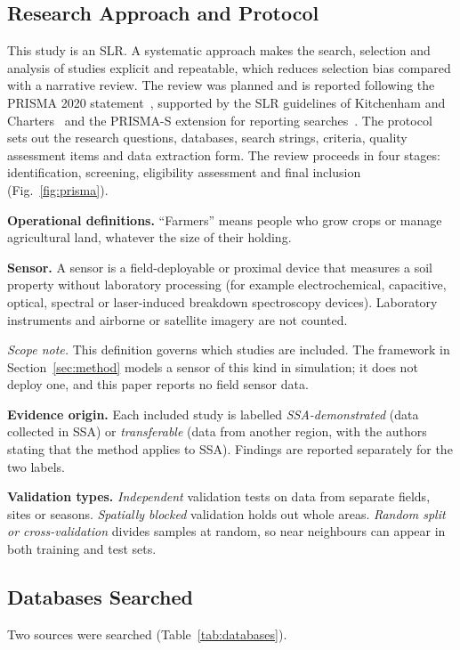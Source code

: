 \documentclass[conference]{IEEEtran}
\begin{document}
\subsection{Research Approach and Protocol}
This study is an SLR. A systematic approach makes the search, selection and
analysis of studies explicit and repeatable, which reduces selection bias
compared with a narrative review. The review was planned and is reported
following the PRISMA 2020 statement~\cite{ref12}, supported by the SLR
guidelines of Kitchenham and Charters~\cite{ref13} and the PRISMA-S extension
for reporting searches~\cite{ref14}. The protocol sets out the research
questions, databases, search strings, criteria, quality assessment items and data
extraction form. The review proceeds in four stages: identification, screening,
eligibility assessment and final inclusion (Fig.~\ref{fig:prisma}).

\noindent\textbf{Operational definitions.} ``Farmers'' means people who grow crops
or manage agricultural land, whatever the size of their holding.

\noindent\textbf{Sensor.} A sensor is a field-deployable or proximal device that
measures a soil property without laboratory processing (for example
electrochemical, capacitive, optical, spectral or laser-induced breakdown
spectroscopy devices). Laboratory instruments and airborne or satellite imagery
are not counted.

\noindent\emph{Scope note.} This definition governs which studies are included.
The framework in Section~\ref{sec:method} models a sensor of this kind in
simulation; it does not deploy one, and this paper reports no field sensor data.

\noindent\textbf{Evidence origin.} Each included study is labelled
\emph{SSA-demonstrated} (data collected in SSA) or \emph{transferable} (data from
another region, with the authors stating that the method applies to SSA).
Findings are reported separately for the two labels.

\noindent\textbf{Validation types.} \emph{Independent} validation tests on data
from separate fields, sites or seasons. \emph{Spatially blocked} validation holds
out whole areas. \emph{Random split or cross-validation} divides samples at
random, so near neighbours can appear in both training and test sets.

\subsection{Databases Searched}
Two sources were searched (Table~\ref{tab:databases}).
\end{document}
